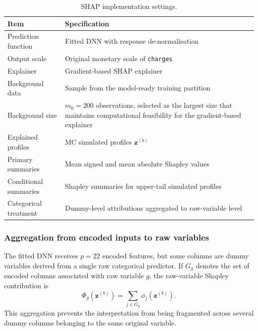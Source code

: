 \begin{table}[H]
\centering
\small
\renewcommand{\arraystretch}{1.15}
\begin{tabular}{p{}p{}}
\toprule
\textbf{Item} & \textbf{Specification} \\
\midrule
Prediction function & Fitted DNN with response de-normalisation \\
Output scale & Original monetary scale of \texttt{charges} \\
Explainer & Gradient-based SHAP explainer \\
Background data & Sample from the model-ready training partition \\
Background size & $m_0 = 200$ observations, selected as the largest size that maintains computational feasibility for the gradient-based explainer \\
Explained profiles & MC simulated profiles $\mathbf{z}^{(b)}$ \\
Primary summaries & Mean signed and mean absolute Shapley values \\
Conditional summaries & Shapley summaries for upper-tail simulated profiles \\
Categorical treatment & Dummy-level attributions aggregated to raw-variable level \\
\bottomrule
\end{tabular}
\caption{SHAP implementation settings.}
\label{tab:shap_implementation_settings_ch3}
\end{table}

\subsubsection{Aggregation from encoded inputs to raw variables}

The fitted DNN receives $p = 22$ encoded features, but some columns are
dummy variables derived from a single raw categorical predictor. If $G_g$
denotes the set of encoded columns associated with raw variable $g$, the
raw-variable Shapley contribution is
\begin{equation}
    \Phi_g
    \left(
        \mathbf{z}^{(b)}
    \right)
    =
    \sum_{j \in G_g}
    \phi_j
    \left(
        \mathbf{z}^{(b)}
    \right).
    \label{eq:raw_variable_shap_aggregation_ch3}
\end{equation}
This aggregation prevents the interpretation from being fragmented across
several dummy columns belonging to the same original variable.

